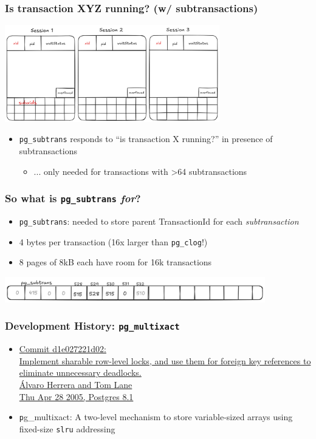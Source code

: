 \begin{frame}
  \frametitle{Is transaction XYZ running? (w/ subtransactions)}
  \center \includegraphics[width=0.7\textwidth]{pgproc-with-subxids.png}
  \begin{itemize}
    \item \texttt{pg\_subtrans} responds to ``is transaction X running?'' in presence of subtransactions
      \begin{itemize}
	\item ... only needed for transactions with >64 subtransactions
      \end{itemize}
  \end{itemize}
\end{frame}

\begin{frame}
  \frametitle{So what is \texttt{pg\_subtrans} \emph{for}?}
  \begin{itemize}
    \item \texttt{pg\_subtrans}: needed to store parent TransactionId for each \textit{subtransaction}
    \item 4 bytes per transaction (16x larger than \texttt{pg\_clog}!)
    \item 8 pages of 8kB each have room for 16k transactions
  \end{itemize}
  \includegraphics[width=0.85\textwidth]{pg_subtrans.png}
\end{frame}

\begin{frame}
  \frametitle{Development History: \texttt{pg\_multixact}}
   \begin{itemize}
      \item {\linksize \href{https://git.postgresql.org/cgit/postgresql.git/commit/?id=d1e027221d0243b7b57eabb0e482923dd7d1c8eb}
	{Commit d1e027221d02: \faExternalLink \\
	Implement sharable row-level locks, and use them for foreign key references to eliminate unnecessary deadlocks. \\
	Álvaro Herrera and Tom Lane \\
	Thu Apr 28 2005, Postgres 8.1}}
      \item {\texttt pg\_multixact}: A two-level mechanism to store
	variable-sized arrays using fixed-size \texttt{slru} addressing
   \end{itemize}
\end{frame}

